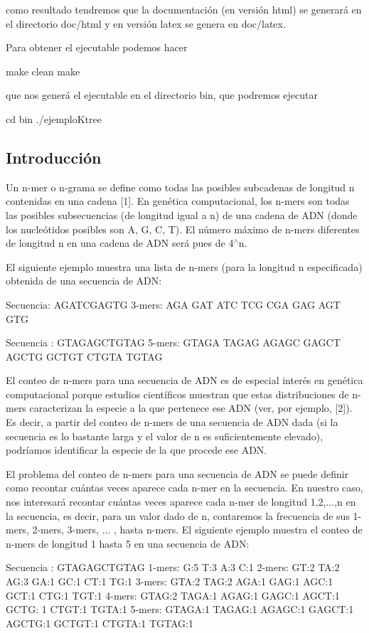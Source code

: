 como resultado tendremos que la documentación (en versión html) se generará en el directorio {\ttfamily doc/html} y en versión latex se genera en {\ttfamily doc/latex}.

Para obtener el ejecutable podemos hacer


\begin{DoxyCode}
make clean
make
\end{DoxyCode}
 que nos generá el ejecutable en el directorio {\ttfamily bin}, que podremos ejecutar 
\begin{DoxyCode}
cd bin
./ejemploKtree
\end{DoxyCode}
\hypertarget{index_intro_sec}{}\subsection{Introducción}\label{index_intro_sec}
Un n-\/mer o n-\/grama se define como todas las posibles subcadenas de longitud n contenidas en una cadena \mbox{[}1\mbox{]}. En genética computacional, los n-\/mers son todas las posibles subsecuencias (de longitud igual a n) de una cadena de A\+DN (donde los nucleótidos posibles son A, G, C, T). El número máximo de n-\/mers diferentes de longitud n en una cadena de A\+DN será pues de 4$^\wedge$n.

El siguiente ejemplo muestra una lista de n-\/mers (para la longitud n especificada) obtenida de una secuencia de A\+DN\+: 
\begin{DoxyCode}
Secuencia:     AGATCGAGTG
3-mers: AGA GAT ATC TCG CGA GAG AGT GTG

Secuencia :     GTAGAGCTGTAG
5-mers: GTAGA TAGAG AGAGC GAGCT AGCTG GCTGT CTGTA TGTAG
\end{DoxyCode}


El conteo de n-\/mers para una secuencia de A\+DN es de especial interés en genética computacional porque estudios científicos muestran que estas distribuciones de n-\/mers caracterizan la especie a la que pertenece ese A\+DN (ver, por ejemplo, \mbox{[}2\mbox{]}). Es decir, a partir del conteo de n-\/mers de una secuencia de A\+DN dada (si la secuencia es lo bastante larga y el valor de n es suficientemente elevado), podríamos identificar la especie de la que procede ese A\+DN.

El problema del conteo de n-\/mers para una secuencia de A\+DN se puede definir como recontar cuántas veces aparece cada n-\/mer en la secuencia. En nuestro caso, nos interesará recontar cuántas veces aparece cada n-\/mer de longitud 1,2,...,n en la secuencia, es decir, para un valor dado de n, contaremos la frecuencia de sus 1-\/mers, 2-\/mers, 3-\/mers, ... , hasta n-\/mers. El siguiente ejemplo muestra el conteo de n-\/mers de longitud 1 hasta 5 en una secuencia de A\+DN\+: 
\begin{DoxyCode}
Secuencia :     GTAGAGCTGTAG
1-mers: G:5 T:3 A:3 C:1
2-mers: GT:2 TA:2 AG:3 GA:1 GC:1 CT:1 TG:1
3-mers: GTA:2 TAG:2 AGA:1 GAG:1 AGC:1 GCT:1 CTG:1 TGT:1
4-mers: GTAG:2 TAGA:1 AGAG:1 GAGC:1 AGCT:1 GCTG: 1 CTGT:1 TGTA:1
5-mers: GTAGA:1 TAGAG:1 AGAGC:1 GAGCT:1 AGCTG:1 GCTGT:1 CTGTA:1 TGTAG:1
\end{DoxyCode}


